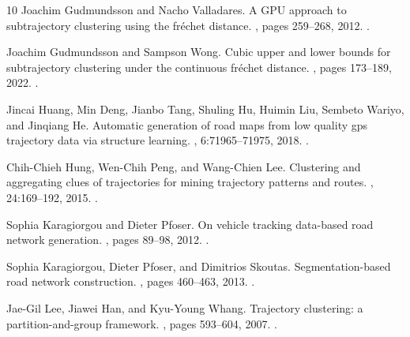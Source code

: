 \documentclass[11pt]{article}
\begin{document}
\begin{thebibliography}{10}
Joachim Gudmundsson and Nacho Valladares.
\newblock A {GPU} approach to subtrajectory clustering using the fr{\'e}chet
  distance.
, pages 259--268, 2012.
\newblock \href {https://doi.org/10.1145/2424321.2424355}
  {}.

Joachim Gudmundsson and Sampson Wong.
\newblock Cubic upper and lower bounds for subtrajectory clustering under the
  continuous fr{\'e}chet distance.
, pages
  173--189, 2022.
\newblock \href {https://doi.org/10.1137/1.9781611977073.9}
  {}.

Jincai Huang, Min Deng, Jianbo Tang, Shuling Hu, Huimin Liu, Sembeto Wariyo,
  and Jinqiang He.
\newblock Automatic generation of road maps from low quality gps trajectory
  data via structure learning.
, 6:71965--71975, 2018.
\newblock \href {https://doi.org/10.1109/ACCESS.2018.2882581}
  {}.

Chih-Chieh Hung, Wen-Chih Peng, and Wang-Chien Lee.
\newblock Clustering and aggregating clues of trajectories for mining
  trajectory patterns and routes.
, 24:169--192, 2015.
\newblock \href {https://doi.org/10.1007/s00778-011-0262-6}
  {}.

Sophia Karagiorgou and Dieter Pfoser.
\newblock On vehicle tracking data-based road network generation.
, pages 89--98, 2012.
\newblock \href {https://doi.org/10.1145/2424321.2424334}
  {}.

Sophia Karagiorgou, Dieter Pfoser, and Dimitrios Skoutas.
\newblock Segmentation-based road network construction.
, pages 460--463, 2013.
\newblock \href {https://doi.org/10.1145/2525314.2525460}
  {}.

Jae-Gil Lee, Jiawei Han, and Kyu-Young Whang.
\newblock Trajectory clustering: a partition-and-group framework.
,
  pages 593--604, 2007.
\newblock \href {https://doi.org/10.1145/1247480.1247546}
  {}.


\end{thebibliography}
\end{document}
